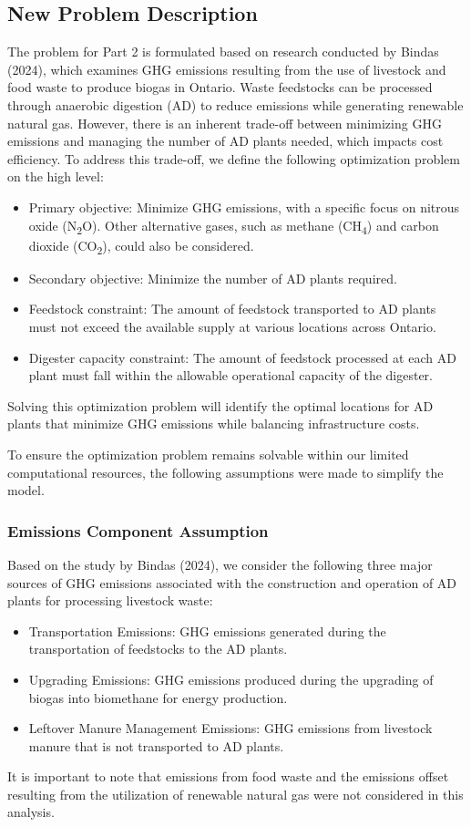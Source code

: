 \documentclass[12pt]{article}
\begin{document}
\subsection{New Problem Description}
The problem for Part 2 is formulated based on research conducted by Bindas (2024), which examines GHG emissions resulting from the use of livestock and food waste to produce biogas in Ontario. Waste feedstocks can be processed through anaerobic digestion (AD) to reduce emissions while generating renewable natural gas. However, there is an inherent trade-off between minimizing GHG emissions and managing the number of AD plants needed, which impacts cost efficiency. To address this trade-off, we define the following optimization problem on the high level:
\begin{itemize}
  \item Primary objective: Minimize GHG emissions, with a specific focus on nitrous oxide (N\textsubscript{2}O). Other alternative gases, such as methane (CH\textsubscript{4}) and carbon dioxide (CO\textsubscript{2}), could also be considered.
  \item Secondary objective: Minimize the number of AD plants required.
  \item Feedstock constraint: The amount of feedstock transported to AD plants must not exceed the available supply at various locations across Ontario.
  \item Digester capacity constraint: The amount of feedstock processed at each AD plant must fall within the allowable operational capacity of the digester.
\end{itemize}
Solving this optimization problem will identify the optimal locations for AD plants that minimize GHG emissions while balancing infrastructure costs.

\noindent To ensure the optimization problem remains solvable within our limited computational resources, the following assumptions were made to simplify the model.

\subsubsection{Emissions Component Assumption}
Based on the study by Bindas (2024), we consider the following three major sources of GHG emissions associated with the construction and operation of AD plants for processing livestock waste:
\begin{itemize}
  \item Transportation Emissions: GHG emissions generated during the transportation of feedstocks to the AD plants.
  \item Upgrading Emissions: GHG emissions produced during the upgrading of biogas into biomethane for energy production.
  \item Leftover Manure Management Emissions: GHG emissions from livestock manure that is not transported to AD plants.
\end{itemize}
It is important to note that emissions from food waste and the emissions offset resulting from the utilization of renewable natural gas were not considered in this analysis.
\end{document}
